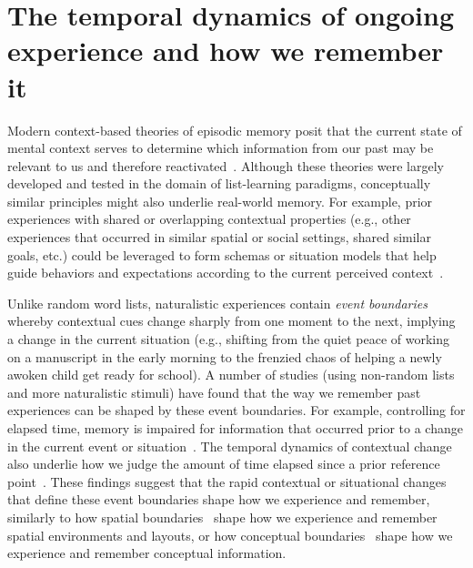 \documentclass{article}
\begin{document}
\section*{The temporal dynamics of ongoing experience and how we remember it}
Modern context-based theories of episodic memory posit that the current state of mental context serves to determine which information from our past may be relevant to us and therefore reactivated~\citep[e.g., ][]{PolyEtal09}. Although these theories were largely developed and tested in the domain of list-learning paradigms, conceptually similar principles might also underlie real-world memory.  For example, prior experiences with shared or overlapping contextual properties (e.g., other experiences that occurred in similar spatial or social settings, shared similar goals, etc.) could be leveraged to form schemas or situation models that help guide behaviors and expectations according to the current perceived context~\citep{RangRitc12, BaldEtal18, AlyEtal18}.

Unlike random word lists, naturalistic experiences contain \textit{event boundaries} whereby contextual cues change sharply from one moment to the next, implying a change in the current situation (e.g., shifting from the quiet peace of working on a manuscript in the early morning to the frenzied chaos of helping a newly awoken child get ready for school).  A number of studies (using non-random lists and more naturalistic stimuli) have found that the way we remember past experiences can be shaped by these event boundaries.  For example, controlling for elapsed time, memory is impaired for information that occurred prior to a change in the current event or situation~\citep[e.g., ][]{RadvCope06, SwalEtal09, SwalEtal11, EzzyDava11, MannEtal16}.  The temporal dynamics of contextual change also underlie how we judge the amount of time elapsed since a prior reference point~\citep{BlocReed78, SahaSmit14}.  These findings suggest that the rapid contextual or situational changes that define these event boundaries shape how we experience and remember, similarly to how spatial boundaries~\citep[e.g., environmental barriers;][]{McKeBuzs16, BrunEtal18} shape how we experience and remember spatial environments and layouts, or how conceptual boundaries~\citep[e.g., distinctions between semantic categories;][]{BrunEtal18} shape how we experience and remember conceptual information.
\end{document}
